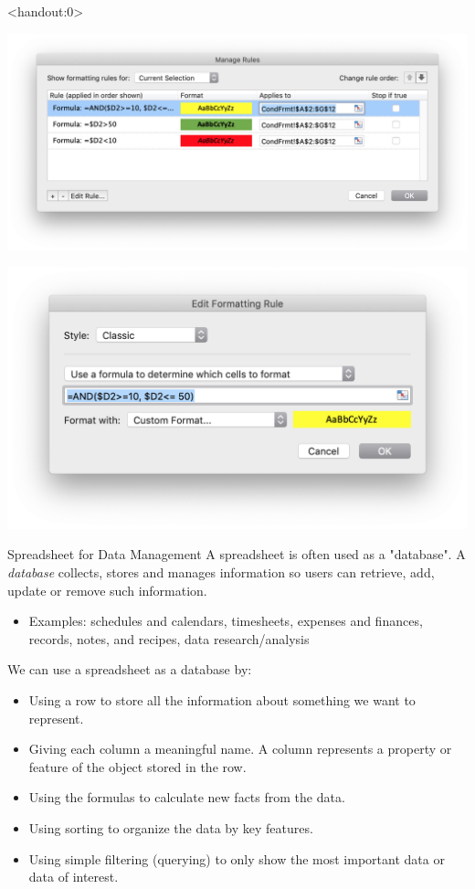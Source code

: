 \documentclass[xcolor=svgnames]{beamer}
\begin{document}
\begin{frame}<handout:0>
\begin{center}
 \includegraphics[width=.8\textwidth]{condform2}
\end{center}
\vspace{-1cm}
\begin{center}
 \includegraphics[width=.8\textwidth]{condform1}
\end{center}
\end{frame}




\begin{frame}{Spreadsheet for Data Management}
A spreadsheet is often used as a "database".  A \emph{database}  collects, stores and manages information
so users can retrieve, add, update or remove such
information.
\begin{itemize}
\item Examples: schedules and calendars, timesheets, expenses and finances, records, notes, and recipes, data research/analysis
\end{itemize}
We can use a spreadsheet as a database by:
\begin{itemize}
\item Using a row to store all the information about something we want to represent.
\item Giving each column a meaningful name.  A column represents a property or feature of the object stored in the row.
\item Using the formulas to calculate new facts from the data.
\item Using sorting to organize the data by key features.
\item Using simple filtering (querying) to only show the most important data or data of interest. 
\end{itemize}
\end{frame}
\end{document}

